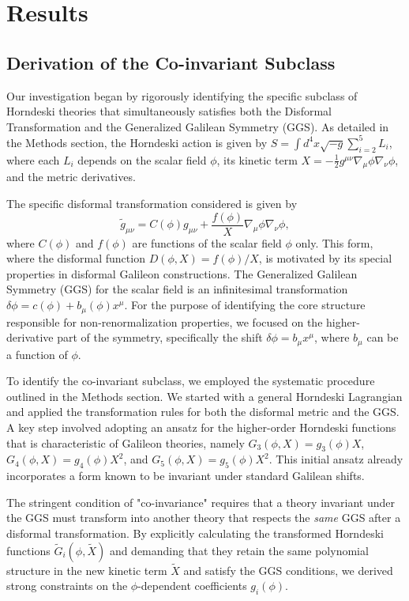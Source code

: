 \documentclass[twocolumn]{aastex631}
\begin{document}
\section{Results}
\label{sec:results}
\subsection{Derivation of the Co-invariant Subclass}
Our investigation began by rigorously identifying the specific subclass of Horndeski theories that simultaneously satisfies both the Disformal Transformation and the Generalized Galilean Symmetry (GGS). As detailed in the Methods section, the Horndeski action is given by $S = \int d^4x \sqrt{-g} \sum_{i=2}^{5} L_i$, where each $L_i$ depends on the scalar field $\phi$, its kinetic term $X = -\frac{1}{2}g^{\mu\nu}\nabla_\mu\phi\nabla_\nu\phi$, and the metric derivatives.

The specific disformal transformation considered is given by
\begin{equation}
    \tilde{g}_{\mu\nu} = C(\phi) g_{\mu\nu} + \frac{f(\phi)}{X} \nabla_\mu\phi \nabla_\nu\phi,
\end{equation}
where $C(\phi)$ and $f(\phi)$ are functions of the scalar field $\phi$ only. This form, where the disformal function $D(\phi, X) = f(\phi)/X$, is motivated by its special properties in disformal Galileon constructions. The Generalized Galilean Symmetry (GGS) for the scalar field is an infinitesimal transformation $\delta \phi = c(\phi) + b_\mu(\phi) x^\mu$. For the purpose of identifying the core structure responsible for non-renormalization properties, we focused on the higher-derivative part of the symmetry, specifically the shift $\delta \phi = b_\mu x^\mu$, where $b_\mu$ can be a function of $\phi$.

To identify the co-invariant subclass, we employed the systematic procedure outlined in the Methods section. We started with a general Horndeski Lagrangian and applied the transformation rules for both the disformal metric and the GGS. A key step involved adopting an ansatz for the higher-order Horndeski functions that is characteristic of Galileon theories, namely $G_3(\phi, X) = g_3(\phi) X$, $G_4(\phi, X) = g_4(\phi) X^2$, and $G_5(\phi, X) = g_5(\phi) X^2$. This initial ansatz already incorporates a form known to be invariant under standard Galilean shifts.

The stringent condition of "co-invariance" requires that a theory invariant under the GGS must transform into another theory that respects the \textit{same} GGS after a disformal transformation. By explicitly calculating the transformed Horndeski functions $\tilde{G}_i(\phi, \tilde{X})$ and demanding that they retain the same polynomial structure in the new kinetic term $\tilde{X}$ and satisfy the GGS conditions, we derived strong constraints on the $\phi$-dependent coefficients $g_i(\phi)$.
\end{document}
